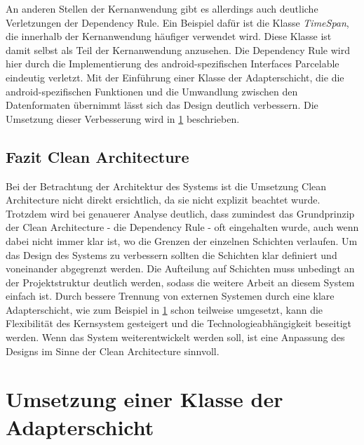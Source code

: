 An anderen Stellen der Kernanwendung gibt es allerdings auch deutliche Verletzungen der Dependency Rule.
Ein Beispiel dafür ist die Klasse \textit{TimeSpan}, die innerhalb der Kernanwendung häufiger verwendet wird.
Diese Klasse ist damit selbst als Teil der Kernanwendung anzusehen.
Die Dependency Rule wird hier durch die Implementierung des android-spezifischen Interfaces Parcelable eindeutig verletzt. 
Mit der Einführung einer Klasse der Adapterschicht, die die android-spezifischen Funktionen und die Umwandlung zwischen den Datenformaten übernimmt lässt sich das Design deutlich verbessern.
Die Umsetzung dieser Verbesserung wird in \ref{sec:TimeSpanAdapter} beschrieben.

\subsection{Fazit Clean Architecture}
Bei der Betrachtung der Architektur des Systems ist die Umsetzung Clean Architecture nicht direkt ersichtlich, da sie nicht explizit beachtet wurde.
Trotzdem wird bei genauerer Analyse deutlich, dass zumindest das Grundprinzip der Clean Architecture - die Dependency Rule - oft eingehalten wurde, auch wenn dabei nicht immer klar ist, wo die Grenzen der einzelnen Schichten verlaufen.
Um das Design des Systems zu verbessern sollten die Schichten klar definiert und voneinander abgegrenzt werden.
Die Aufteilung auf Schichten muss unbedingt an der Projektstruktur deutlich werden, sodass die weitere Arbeit an diesem System einfach ist.
Durch bessere Trennung von externen Systemen durch eine klare Adapterschicht, wie zum Beispiel in \ref{sec:TimeSpanAdapter} schon teilweise umgesetzt, kann die Flexibilität des Kernsystem gesteigert und die Technologieabhängigkeit beseitigt werden.
Wenn das System weiterentwickelt werden soll, ist eine Anpassung des Designs im Sinne der Clean Architecture sinnvoll.

\section{Umsetzung einer Klasse der Adapterschicht}
\label{sec:TimeSpanAdapter}